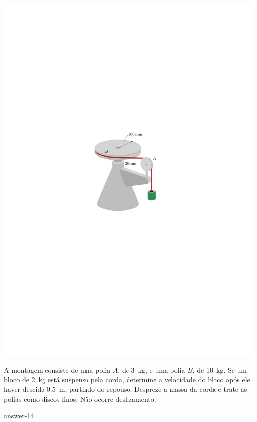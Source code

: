\begin{minipage}{.5\linewidth}
	\begin{flushleft}
		\includegraphics[scale=1.2]{../../images/draw_6_1}
	\end{flushleft}
\end{minipage}
\begin{minipage}{.5\linewidth}
	\vspace{-1cm}
	\item A montagem consiste de uma polia $A$, de \SI{3}{\kilogram}, e uma polia $B$, de \SI{10}{\kilogram}. Se um bloco de \SI{2}{\kilogram} está suspenso pela corda, determine a velocidade do bloco após ele haver descido \SI{.5}{\meter}, partindo do repouso. Despreze a massa da corda e trate as polias como discos finos. Não ocorre deslizamento.
	
	{answer-14}
\end{minipage}